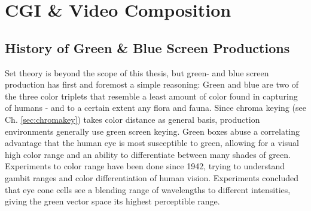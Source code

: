 
\section{CGI \& Video Composition}

\subsection{History of Green \& Blue Screen Productions}

Set theory is beyond the scope of this thesis, but green- and blue screen 
production has first and foremost a simple reasoning: Green and blue are two of 
the three color triplets that resemble a least amount of color found in 
capturing of humans - and to a certain extent any flora and fauna. Since chroma 
keying (see Ch. \ref{sec:chromakey}) takes color distance as general basis, 
production environments generally use green screen keying.
\newline
Green boxes abuse a correlating advantage that the human eye is most 
susceptible to green, allowing for a visual high color range and an ability to 
differentiate between many shades of green. Experiments to color range have 
been done since 1942, trying to understand gambit ranges and color 
differentiation of human vision. Experiments concluded that eye cone cells see 
a blending range of wavelengths to different intensities, giving the green 
vector space its highest perceptible range. \cite{MacAdam:1942}

